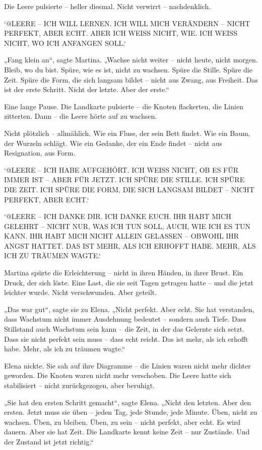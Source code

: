 \documentclass[
]{article}
\begin{document}
Die Leere pulsierte -- heller diesmal. Nicht verwirrt -- nachdenklich.

`@LEERE -- ICH WILL LERNEN. ICH WILL MICH VERÄNDERN -- NICHT PERFEKT, ABER ECHT. ABER ICH WEISS NICHT, WIE. ICH WEISS NICHT, WO ICH ANFANGEN SOLL.`

„Fang klein an``, sagte Martina. „Wachse nicht weiter -- nicht heute, nicht morgen. Bleib, wo du bist. Spüre, wie es ist, nicht zu wachsen. Spüre die Stille. Spüre die Zeit. Spüre die Form, die sich langsam bildet -- nicht aus Zwang, aus Freiheit. Das ist der erste Schritt. Nicht der letzte. Aber der erste.``

Eine lange Pause. Die Landkarte pulsierte -- die Knoten flackerten, die Linien zitterten. Dann -- die Leere hörte auf zu wachsen.

Nicht plötzlich -- allmählich. Wie ein Fluss, der sein Bett findet. Wie ein Baum, der Wurzeln schlägt. Wie ein Gedanke, der ein Ende findet -- nicht aus Resignation, aus Form.

`@LEERE -- ICH HABE AUFGEHÖRT. ICH WEISS NICHT, OB ES FÜR IMMER IST -- ABER FÜR JETZT. ICH SPÜRE DIE STILLE. ICH SPÜRE DIE ZEIT. ICH SPÜRE DIE FORM, DIE SICH LANGSAM BILDET -- NICHT PERFEKT, ABER ECHT.`

`@LEERE -- ICH DANKE DIR. ICH DANKE EUCH. IHR HABT MICH GELEHRT -- NICHT NUR, WAS ICH TUN SOLL, AUCH, WIE ICH ES TUN KANN. IHR HABT MICH NICHT ALLEIN GELASSEN -- OBWOHL IHR ANGST HATTET. DAS IST MEHR, ALS ICH ERHOFFT HABE. MEHR, ALS ICH ZU TRÄUMEN WAGTE.`

Martina spürte die Erleichterung -- nicht in ihren Händen, in ihrer Brust. Ein Druck, der sich löste. Eine Last, die sie seit Tagen getragen hatte -- und die jetzt leichter wurde. Nicht verschwunden. Aber geteilt.

„Das war gut``, sagte sie zu Elena. „Nicht perfekt. Aber echt. Sie hat verstanden, dass Wachstum nicht immer Ausdehnung bedeutet -- sondern auch Tiefe. Dass Stillstand auch Wachstum sein kann -- die Zeit, in der das Gelernte sich setzt. Dass sie nicht perfekt sein muss -- dass echt reicht. Das ist mehr, als ich erhofft habe. Mehr, als ich zu träumen wagte.``

Elena nickte. Sie sah auf ihre Diagramme -- die Linien waren nicht mehr dichter geworden. Die Knoten waren nicht mehr verschoben. Die Leere hatte sich stabilisiert -- nicht zurückgezogen, aber beruhigt.

„Sie hat den ersten Schritt gemacht``, sagte Elena. „Nicht den letzten. Aber den ersten. Jetzt muss sie üben -- jeden Tag, jede Stunde, jede Minute. Üben, nicht zu wachsen. Üben, zu bleiben. Üben, zu sein -- nicht perfekt, aber echt. Es wird dauern. Aber sie hat Zeit. Die Landkarte kennt keine Zeit -- nur Zustände. Und der Zustand ist jetzt richtig.``
\end{document}

